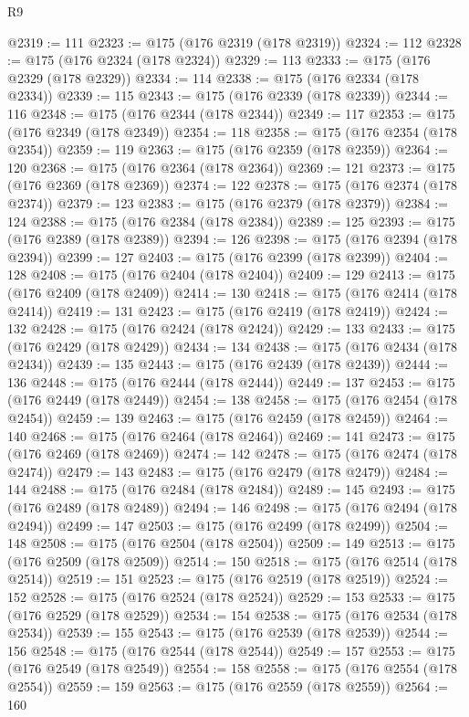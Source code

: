 \begin{lexlean}{R9}
\begin{coremodule}
@2319 := 111
@2323 := @175 (@176 @2319 (@178 @2319))
@2324 := 112
@2328 := @175 (@176 @2324 (@178 @2324))
@2329 := 113
@2333 := @175 (@176 @2329 (@178 @2329))
@2334 := 114
@2338 := @175 (@176 @2334 (@178 @2334))
@2339 := 115
@2343 := @175 (@176 @2339 (@178 @2339))
@2344 := 116
@2348 := @175 (@176 @2344 (@178 @2344))
@2349 := 117
@2353 := @175 (@176 @2349 (@178 @2349))
@2354 := 118
@2358 := @175 (@176 @2354 (@178 @2354))
@2359 := 119
@2363 := @175 (@176 @2359 (@178 @2359))
@2364 := 120
@2368 := @175 (@176 @2364 (@178 @2364))
@2369 := 121
@2373 := @175 (@176 @2369 (@178 @2369))
@2374 := 122
@2378 := @175 (@176 @2374 (@178 @2374))
@2379 := 123
@2383 := @175 (@176 @2379 (@178 @2379))
@2384 := 124
@2388 := @175 (@176 @2384 (@178 @2384))
@2389 := 125
@2393 := @175 (@176 @2389 (@178 @2389))
@2394 := 126
@2398 := @175 (@176 @2394 (@178 @2394))
@2399 := 127
@2403 := @175 (@176 @2399 (@178 @2399))
@2404 := 128
@2408 := @175 (@176 @2404 (@178 @2404))
@2409 := 129
@2413 := @175 (@176 @2409 (@178 @2409))
@2414 := 130
@2418 := @175 (@176 @2414 (@178 @2414))
@2419 := 131
@2423 := @175 (@176 @2419 (@178 @2419))
@2424 := 132
@2428 := @175 (@176 @2424 (@178 @2424))
@2429 := 133
@2433 := @175 (@176 @2429 (@178 @2429))
@2434 := 134
@2438 := @175 (@176 @2434 (@178 @2434))
@2439 := 135
@2443 := @175 (@176 @2439 (@178 @2439))
@2444 := 136
@2448 := @175 (@176 @2444 (@178 @2444))
@2449 := 137
@2453 := @175 (@176 @2449 (@178 @2449))
@2454 := 138
@2458 := @175 (@176 @2454 (@178 @2454))
@2459 := 139
@2463 := @175 (@176 @2459 (@178 @2459))
@2464 := 140
@2468 := @175 (@176 @2464 (@178 @2464))
@2469 := 141
@2473 := @175 (@176 @2469 (@178 @2469))
@2474 := 142
@2478 := @175 (@176 @2474 (@178 @2474))
@2479 := 143
@2483 := @175 (@176 @2479 (@178 @2479))
@2484 := 144
@2488 := @175 (@176 @2484 (@178 @2484))
@2489 := 145
@2493 := @175 (@176 @2489 (@178 @2489))
@2494 := 146
@2498 := @175 (@176 @2494 (@178 @2494))
@2499 := 147
@2503 := @175 (@176 @2499 (@178 @2499))
@2504 := 148
@2508 := @175 (@176 @2504 (@178 @2504))
@2509 := 149
@2513 := @175 (@176 @2509 (@178 @2509))
@2514 := 150
@2518 := @175 (@176 @2514 (@178 @2514))
@2519 := 151
@2523 := @175 (@176 @2519 (@178 @2519))
@2524 := 152
@2528 := @175 (@176 @2524 (@178 @2524))
@2529 := 153
@2533 := @175 (@176 @2529 (@178 @2529))
@2534 := 154
@2538 := @175 (@176 @2534 (@178 @2534))
@2539 := 155
@2543 := @175 (@176 @2539 (@178 @2539))
@2544 := 156
@2548 := @175 (@176 @2544 (@178 @2544))
@2549 := 157
@2553 := @175 (@176 @2549 (@178 @2549))
@2554 := 158
@2558 := @175 (@176 @2554 (@178 @2554))
@2559 := 159
@2563 := @175 (@176 @2559 (@178 @2559))
@2564 := 160

\end{coremodule}
\end{lexlean}
